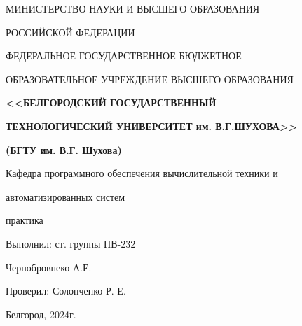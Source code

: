 \begin{center}
	МИНИСТЕРСТВО НАУКИ И ВЫСШЕГО ОБРАЗОВАНИЯ

	РОССИЙСКОЙ ФЕДЕРАЦИИ

	\vskip 0.5cm

	ФЕДЕРАЛЬНОЕ ГОСУДАРСТВЕННОЕ БЮДЖЕТНОЕ

	ОБРАЗОВАТЕЛЬНОЕ УЧРЕЖДЕНИЕ ВЫСШЕГО ОБРАЗОВАНИЯ

	\vskip 0.5cm

	\textbf{<<БЕЛГОРОДСКИЙ ГОСУДАРСТВЕННЫЙ}

	\textbf{ТЕХНОЛОГИЧЕСКИЙ УНИВЕРСИТЕТ им. В.Г.ШУХОВА>>}

	\textbf{(БГТУ им. В.Г. Шухова)}

	\vskip 0.5cm

	Кафедра программного обеспечения вычислительной техники и

	автоматизированных систем

	\vskip 3cm

	\large{ практика}

	\vskip 7cm

	\begin{flushright}
		Выполнил: ст. группы ПВ-232

		Чернобровнеко А.Е.

		Проверил: Солонченко Р. Е.
	\end{flushright}

	\vskip 6cm

	Белгород, 2024г.
\end{center}

\newpage

\onehalfspacing\tableofcontents

\newpage

